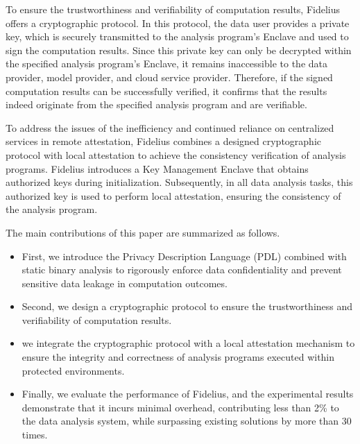 To ensure the trustworthiness and verifiability of computation results, Fidelius offers a cryptographic protocol. In this protocol, the data user provides a private key, which is securely transmitted to the analysis program's Enclave and used to sign the computation results. Since this private key can only be decrypted within the specified analysis program's Enclave, it remains inaccessible to the data provider, model provider, and cloud service provider. Therefore, if the signed computation results can be successfully verified, it confirms that the results indeed originate from the specified analysis program and are verifiable.

To address the issues of the inefficiency and continued reliance on centralized services in remote attestation, Fidelius combines a designed cryptographic protocol with local attestation to achieve the consistency verification of analysis programs. Fidelius introduces a Key Management Enclave that obtains authorized keys during initialization. Subsequently, in all data analysis tasks, this authorized key is used to perform local attestation, ensuring the consistency of the analysis program.

The main contributions of this paper are summarized as follows.
\begin{itemize}
    \item First, we introduce the Privacy Description Language (PDL) combined with static binary analysis to rigorously enforce data confidentiality and prevent sensitive data leakage in computation outcomes.
    \item Second, we design a cryptographic protocol to ensure the trustworthiness and verifiability of computation results.
    \item we integrate the cryptographic protocol with a local attestation mechanism to ensure the integrity and correctness of analysis programs executed within protected environments.
    \item Finally, we evaluate the performance of Fidelius, and the experimental results demonstrate that it incurs minimal overhead, contributing less than 2\% to the data analysis system, while surpassing existing solutions by more than 30 times.
\end{itemize}



